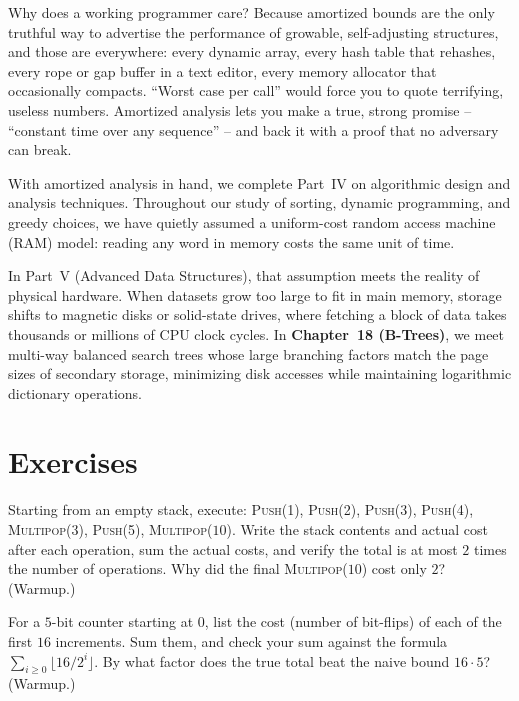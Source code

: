 \begin{aestheticbox}
Why does a working programmer care? Because amortized bounds are the only truthful
way to advertise the performance of growable, self-adjusting structures, and those
are everywhere: every dynamic array, every hash table that rehashes, every rope or
gap buffer in a text editor, every memory allocator that occasionally compacts.
``Worst case per call'' would force you to quote terrifying, useless numbers.
Amortized analysis lets you make a true, strong promise -- ``constant time over any
sequence'' -- and back it with a proof that no adversary can break.
\end{aestheticbox}

With amortized analysis in hand, we complete Part~IV on algorithmic design and analysis
techniques. Throughout our study of sorting, dynamic programming, and greedy choices, we
have quietly assumed a uniform-cost random access machine (RAM) model: reading any word in
memory costs the same unit of time.

In Part~V (Advanced Data Structures), that assumption meets the reality of physical hardware.
When datasets grow too large to fit in main memory, storage shifts to magnetic disks or solid-state
drives, where fetching a block of data takes thousands or millions of CPU clock cycles. In
\textbf{Chapter~18 (B-Trees)}, we meet multi-way balanced search trees whose large branching
factors match the page sizes of secondary storage, minimizing disk accesses while maintaining
logarithmic dictionary operations.

\section{Exercises}

\begin{exercise}
Starting from an empty stack, execute: \textsc{Push}(1), \textsc{Push}(2),
\textsc{Push}(3), \textsc{Push}(4), \textsc{Multipop}($3$), \textsc{Push}(5),
\textsc{Multipop}($10$). Write the stack contents and actual cost after each
operation, sum the actual costs, and verify the total is at most $2$ times the
number of operations. Why did the final \textsc{Multipop}($10$) cost only $2$?
(Warmup.)
\end{exercise}

\begin{exercise}
For a $5$-bit counter starting at $0$, list the cost (number of bit-flips) of each
of the first $16$ increments. Sum them, and check your sum against the formula
$\sum_{i\ge 0}\lfloor 16/2^i\rfloor$. By what factor does the true total beat the
naive bound $16 \cdot 5$? (Warmup.)
\end{exercise}

